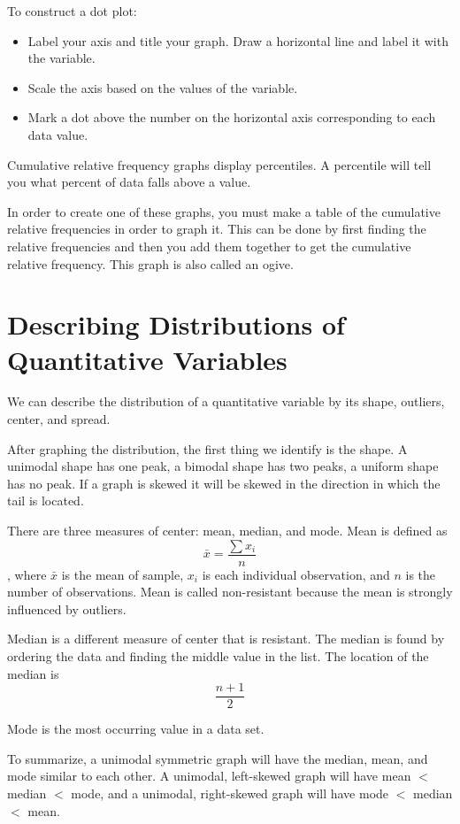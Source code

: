 \documentclass[../stats.tex]{subfiles}
\begin{document}
To construct a dot plot:
\begin{itemize}
    \item Label your axis and title your graph. Draw a horizontal line and label it with the variable.
    \item Scale the axis based on the values of the variable.
    \item Mark a dot above the number on the horizontal axis corresponding to each data value.
\end{itemize}

Cumulative relative frequency graphs display percentiles. A percentile will tell you what percent of data falls above a value.

In order to create one of these graphs, you must make a table of the cumulative relative frequencies in order to graph it. 
This can be done by first finding the relative frequencies and then you add them together to get the cumulative relative frequency. 
This graph is also called an ogive.

\section{Describing Distributions of Quantitative Variables}
We can describe the distribution of a quantitative variable by its shape, outliers, center, and spread.

After graphing the distribution, the first thing we identify is the shape. 
A unimodal shape has one peak, a bimodal shape has two peaks, a uniform shape has no peak. 
If a graph is skewed it will be skewed in the direction in which the tail is located.

There are three measures of center: mean, median, and mode. Mean is defined as 
\[\bar{x}=\frac{\sum{x_i}}{n}\]
, where $\bar{x}$ is the mean of sample, $x_i$ is each individual observation, and $n$ is the number of observations. 
Mean is called non-resistant because the mean is strongly influenced by outliers.

Median is a different measure of center that is resistant. The median is found by ordering the data and finding the middle value in the list. 
The location of the median is 
\[\frac{n+1}{2}\]

Mode is the most occurring value in a data set.

To summarize, a unimodal symmetric graph will have the median, mean, and mode similar to each other. 
A unimodal, left-skewed graph will have mean $<$ median $<$ mode, and a unimodal, right-skewed graph will have mode $<$ median $<$ mean.
\end{document}
